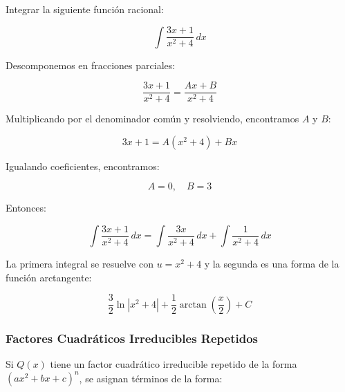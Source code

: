\begin{example}
    Integrar la siguiente función racional:

\[
\int \frac{3x + 1}{x^2 + 4} \, dx
\]

Descomponemos en fracciones parciales:

\[
\frac{3x + 1}{x^2 + 4} = \frac{Ax + B}{x^2 + 4}
\]

Multiplicando por el denominador común y resolviendo, encontramos \( A \) y \( B \):

\[
3x + 1 = A(x^2 + 4) + Bx
\]

Igualando coeficientes, encontramos:

\[
A = 0, \quad B = 3
\]

Entonces:

\[
\int \frac{3x + 1}{x^2 + 4} \, dx = \int \frac{3x}{x^2 + 4} \, dx + \int \frac{1}{x^2 + 4} \, dx
\]

La primera integral se resuelve con \( u = x^2 + 4 \) y la segunda es una forma de la función arctangente:

\[
\frac{3}{2} \ln |x^2 + 4| + \frac{1}{2} \arctan\left(\frac{x}{2}\right) + C
\]
\end{example}

\subsubsection{Factores Cuadráticos Irreducibles Repetidos}
Si \( Q(x) \) tiene un factor cuadrático irreducible repetido de la forma \( (ax^2 + bx + c)^n \), se asignan términos de la forma:

